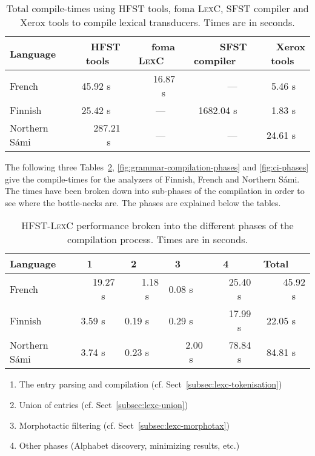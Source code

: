 \documentclass[a4paper]{article}
\begin{document}
\begin{table}[!h]
  \begin{center}
    \begin{tabular}{l|r|r|r|r}
      \hline
      Language & ~~\textsc{HFST} tools~~ & ~~foma \textsc{LexC}~~ & ~~\textsc{SFST} compiler~~ & ~~Xerox tools~~ \\
      \hline
      French          & 45.92 s~~ & ~~16.87 s~~ & ---~~        & 5.46 s~~\\
      Finnish         & 25.42 s~~ & ---~~      & ~~1682.04 s~~ & 1.83 s~~\\
      Northern S\'ami~~ & ~~287.21 s~~ & ---~~      & ---~~        & ~~24.61 s~~\\
      \hline
    \end{tabular}
    \vskip0.5cm
    \caption{Total compile-times using \textsc{HFST} tools, foma
    \textsc{LexC}, \textsc{SFST} compiler and Xerox tools to compile
    lexical transducers. Times are in
    seconds.}\label{fig:lexicon-compilation-comparisons}
  \end{center}
\end{table}

The following three Tables~\ref{fig:lexicon-compilation-phases},
\ref{fig:grammar-compilation-phases} and \ref{fig:ci-phases} give the
 compile-times for the analyzers of Finnish, French and
Northern S\'ami. The times have been broken down into sub-phases of the
compilation in order to see where the bottle-necks are. The phases are
explained below the tables.

\begin{table}[!h]
  \begin{center}
    \begin{tabular}{l|rrrr|r}
      \hline
      Language        & 1~~~~     & 2~~~~     & 3~~~~     & 4~~~~     & Total~~~ \\
      \hline
      French          & ~~19.27 s~~ & ~~1.18 s~~ & 0.08 s~~ & ~~25.40 s~~ & ~~45.92 s~~ \\
      Finnish         & 3.59  s~~ & 0.19 s~~ & 0.29 s~~ & 17.99 s~~ & 22.05 s~~ \\
      Northern S\'ami~~ & 3.74  s~~ & 0.23 s~~ & ~~2.00 s~~ & 78.84 s~~ & 84.81 s~~ \\ 
      \hline
    \end{tabular}
    \vskip0.5cm
    \begin{enumerate}
    \item The entry parsing and compilation
    (cf. Sect~\ref{subsec:lexc-tokenisation})
    \item Union of entries (cf. Sect~\ref{subsec:lexc-union})
    \item Morphotactic filtering
    (cf. Sect~\ref{subsec:lexc-morphotax})
    \item Other phases (Alphabet discovery, minimizing results, etc.)
    \end{enumerate}
    \caption{\textsc{HFST-LexC} performance broken into the different
    phases of the compilation process. Times are in
    seconds.}\label{fig:lexicon-compilation-phases}
  \end{center}
\end{table}
\end{document}
